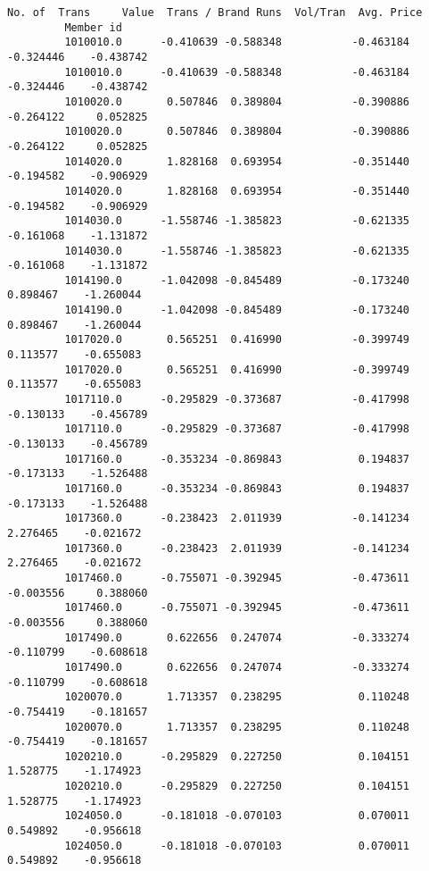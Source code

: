 \documentclass[11pt]{article}
\begin{document}
\begin{Verbatim}[commandchars=\\\{\}]
                    No. of  Trans     Value  Trans / Brand Runs  Vol/Tran  Avg. Price   
         Member id                                                                      
         1010010.0      -0.410639 -0.588348           -0.463184 -0.324446    -0.438742  
         1010010.0      -0.410639 -0.588348           -0.463184 -0.324446    -0.438742  
         1010020.0       0.507846  0.389804           -0.390886 -0.264122     0.052825  
         1010020.0       0.507846  0.389804           -0.390886 -0.264122     0.052825  
         1014020.0       1.828168  0.693954           -0.351440 -0.194582    -0.906929  
         1014020.0       1.828168  0.693954           -0.351440 -0.194582    -0.906929  
         1014030.0      -1.558746 -1.385823           -0.621335 -0.161068    -1.131872  
         1014030.0      -1.558746 -1.385823           -0.621335 -0.161068    -1.131872  
         1014190.0      -1.042098 -0.845489           -0.173240  0.898467    -1.260044  
         1014190.0      -1.042098 -0.845489           -0.173240  0.898467    -1.260044  
         1017020.0       0.565251  0.416990           -0.399749  0.113577    -0.655083  
         1017020.0       0.565251  0.416990           -0.399749  0.113577    -0.655083  
         1017110.0      -0.295829 -0.373687           -0.417998 -0.130133    -0.456789  
         1017110.0      -0.295829 -0.373687           -0.417998 -0.130133    -0.456789  
         1017160.0      -0.353234 -0.869843            0.194837 -0.173133    -1.526488  
         1017160.0      -0.353234 -0.869843            0.194837 -0.173133    -1.526488  
         1017360.0      -0.238423  2.011939           -0.141234  2.276465    -0.021672  
         1017360.0      -0.238423  2.011939           -0.141234  2.276465    -0.021672  
         1017460.0      -0.755071 -0.392945           -0.473611 -0.003556     0.388060  
         1017460.0      -0.755071 -0.392945           -0.473611 -0.003556     0.388060  
         1017490.0       0.622656  0.247074           -0.333274 -0.110799    -0.608618  
         1017490.0       0.622656  0.247074           -0.333274 -0.110799    -0.608618  
         1020070.0       1.713357  0.238295            0.110248 -0.754419    -0.181657  
         1020070.0       1.713357  0.238295            0.110248 -0.754419    -0.181657  
         1020210.0      -0.295829  0.227250            0.104151  1.528775    -1.174923  
         1020210.0      -0.295829  0.227250            0.104151  1.528775    -1.174923  
         1024050.0      -0.181018 -0.070103            0.070011  0.549892    -0.956618  
         1024050.0      -0.181018 -0.070103            0.070011  0.549892    -0.956618  

\end{Verbatim}
\end{document}
